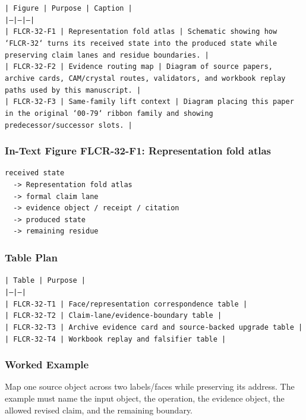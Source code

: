 \documentclass[11pt]{article}
\begin{document}
\noindent\texttt{| Figure | Purpose | Caption |}\\
\noindent\texttt{|---|---|---|}\\
\noindent\texttt{| FLCR-32-F1 | Representation fold atlas | Schematic showing how `FLCR-32` turns its received state into the produced state while preserving claim lanes and residue boundaries. |}\\
\noindent\texttt{| FLCR-32-F2 | Evidence routing map | Diagram of source papers, archive cards, CAM/crystal routes, validators, and workbook replay paths used by this manuscript. |}\\
\noindent\texttt{| FLCR-32-F3 | Same-family lift context | Diagram placing this paper in the original `00-79` ribbon family and showing predecessor/successor slots. |}\\

\subsubsection*{In-Text Figure FLCR-32-F1: Representation fold atlas}

\begin{verbatim}
received state
  -> Representation fold atlas
  -> formal claim lane
  -> evidence object / receipt / citation
  -> produced state
  -> remaining residue
\end{verbatim}

\subsubsection*{Table Plan}

\noindent\texttt{| Table | Purpose |}\\
\noindent\texttt{|---|---|}\\
\noindent\texttt{| FLCR-32-T1 | Face/representation correspondence table |}\\
\noindent\texttt{| FLCR-32-T2 | Claim-lane/evidence-boundary table |}\\
\noindent\texttt{| FLCR-32-T3 | Archive evidence card and source-backed upgrade table |}\\
\noindent\texttt{| FLCR-32-T4 | Workbook replay and falsifier table |}\\

\subsubsection*{Worked Example}

Map one source object across two labels/faces while preserving its address. The example must name the input object, the operation,
the evidence object, the allowed revised claim, and the remaining boundary.
\end{document}
